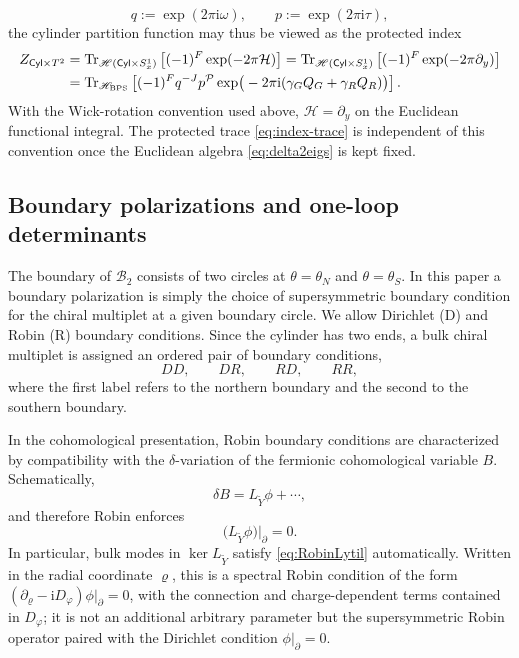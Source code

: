 \documentclass[11pt,a4paper]{article}
\numberwithin{equation}{section}
\theoremstyle{plain}
\theoremstyle{definition}
\theoremstyle{remark}
\newcommand{\ii}{\mathrm{i}}
\newcommand{\nn}{\nonumber}
\newcommand{\cyl}{\mathsf{Cyl}}
\begin{document}
\begin{equation}
q:=\exp(2\pi\ii\omega),
\qquad
p:=\exp(2\pi\ii\tau),
\label{eq:index-pq-def}
\end{equation}
the cylinder partition function may thus be viewed as the protected index
\begin{align}
Z_{\cyl\times T^2}
&=
\operatorname{Tr}_{\mathscr H(\cyl\times S^1_x)}
\left[(-1)^F\exp(-2\pi\mathcal H)\right]
=
\operatorname{Tr}_{\mathscr H(\cyl\times S^1_x)}
\left[(-1)^F\exp(-2\pi\partial_y)\right]
\nn\\
&=
\operatorname{Tr}_{\mathscr H_{\rm BPS}}
\left[
(-1)^F q^{-J}p^{\mathcal P}
\exp\!\big(-2\pi\ii(\gamma_G Q_G+\gamma_R Q_R)\big)
\right].
\label{eq:index-trace}
\end{align}
With the Wick-rotation convention used above, \(\mathcal H=\partial_y\) on the Euclidean functional integral.  The protected trace \eqref{eq:index-trace} is independent of this convention once the Euclidean algebra \eqref{eq:delta2eigs} is kept fixed.


\subsection{Boundary polarizations and one-loop determinants}

The boundary of $\mathcal{B}_2$ consists of two circles at $\theta=\theta_N$ and $\theta=\theta_S$.  In this paper a boundary polarization is simply the choice of supersymmetric boundary condition for the chiral multiplet at a given boundary circle.  We allow Dirichlet (D) and Robin (R) boundary conditions.  Since the cylinder has two ends, a bulk chiral multiplet is assigned an ordered pair of boundary conditions,
\[
DD,\qquad DR,\qquad RD,\qquad RR,
\]
where the first label refers to the northern boundary and the second to the southern boundary.

In the cohomological presentation, Robin boundary conditions are characterized by compatibility with the $\delta$-variation of the fermionic cohomological variable $B$. Schematically,
\begin{equation}
\delta B = L_{\widetilde Y}\phi + \cdots,
\label{eq:deltaBschem}
\end{equation}
and therefore Robin enforces
\begin{equation}
\big(L_{\widetilde Y}\phi\big)\big|_{\partial}=0.
\label{eq:RobinLytil}
\end{equation}
In particular, bulk modes in $\ker L_{\widetilde Y}$ satisfy \eqref{eq:RobinLytil} automatically.  Written in the radial coordinate \(\varrho\), this is a spectral Robin condition of the form \((\partial_\varrho-\ii D_\varphi)\phi|_\partial=0\), with the connection and charge-dependent terms contained in \(D_\varphi\); it is not an additional arbitrary parameter but the supersymmetric Robin operator paired with the Dirichlet condition \(\phi|_\partial=0\).
\end{document}
